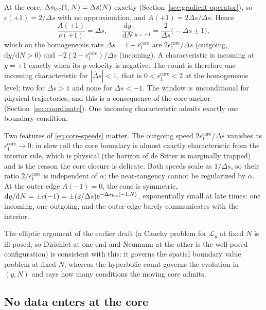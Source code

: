 \documentclass[a4paper,11pt]{article}
\renewcommand{\d}{\mathrm{d}}
\newcommand{\e}[1]{\mathrm{e}^{{#1}}}
\newcommand{\Ny}{N}                          %
\newcommand{\epsSR}{\epsilon_1}              %
\newcommand{\yco}{y}                         %
\newcommand{\Deltas}{\Delta s}                %
\newcommand{\epscore}{\epsSR^{\mathrm{core}}} %
\newcommand{\advcoef}{A}                     %
\newcommand{\Lop}{\mathcal{L}_\yco}          %
\newcommand{\wspeed}{c}                       %
\begin{document}
At the core, $\Deltas_{\rm loc}(1,\Ny)=\Deltas(\Ny)$ exactly
(Section~\ref{sec:gradient-operator}), so $\wspeed(+1)=2/\Deltas$ with no
approximation, and $\advcoef(+1)=2\dot{\Deltas}/\Deltas$. Hence
\begin{equation}
    \frac{\advcoef(+1)}{\wspeed(+1)} = \dot{\Deltas} ,
    \qquad
    \frac{\d\yco}{\d\Ny}\bigg|_{\yco=+1} = \frac{2}{\Deltas}\big(-\dot{\Deltas}\pm1\big) ,
    \label{eq:core-speeds}
\end{equation}
which on the homogeneous rate $\dot{\Deltas}=1-\epscore$ are
$2\epscore/\Deltas$ (outgoing, $\d\yco/\d\Ny>0$) and
$-2(2-\epscore)/\Deltas$ (incoming). A characteristic is incoming at
$\yco=+1$ exactly when its $\yco$-velocity is negative. The count is
therefore one incoming characteristic for $|\dot{\Deltas}|<1$, that is
$0<\epscore<2$ at the homogeneous level; two for $\dot{\Deltas}>1$ and
none for $\dot{\Deltas}<-1$. The window is unconditional for physical
trajectories, and this is a consequence of the core anchor
(Section~\ref{sec:coordinate}). One incoming characteristic admits exactly
one boundary condition.

Two features of \eqref{eq:core-speeds} matter. The outgoing speed
$2\epscore/\Deltas$ vanishes as $\epscore\to0$: in slow roll the core
boundary is almost exactly characteristic from the interior side, which
is physical (the horizon of de Sitter is marginally trapped) and is the
reason the core closure is delicate. Both speeds scale as $1/\Deltas$, so
their ratio $2/\epscore$ is independent of $\alpha$; the near-tangency
cannot be regularized by $\alpha$. At the outer edge $\advcoef(-1)=0$, the
cone is symmetric, $\d\yco/\d\Ny=\pm\wspeed(-1)=\pm(2/\Deltas)\e{-\Deltas_{\rm loc}(-1,\Ny)}$,
exponentially small at late times: one incoming, one outgoing, and the
outer edge barely communicates with the interior.

The elliptic argument of the earlier draft (a Cauchy problem for $\Lop$ at
fixed $\Ny$ is ill-posed, so Dirichlet at one end and Neumann at the other
is the well-posed configuration) is consistent with this: it governs the
spatial boundary value problem at fixed $\Ny$, whereas the hyperbolic
count governs the evolution in $(\yco,\Ny)$ and says how many conditions
the moving core admits.

\subsection{No data enters at the core}
\label{sec:no-data}
\end{document}
